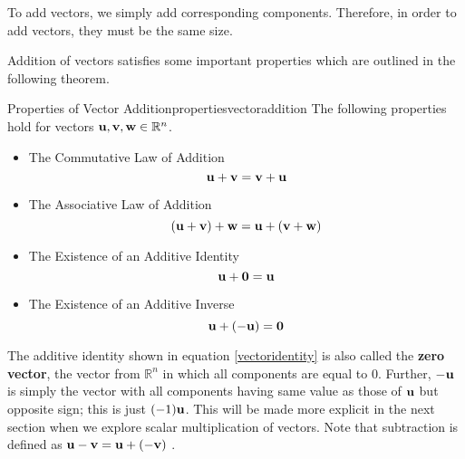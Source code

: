 To add vectors, we simply add corresponding components. Therefore, in order to add vectors, they must
be the same size.

Addition of vectors satisfies some important properties which are outlined in the following theorem.  

\begin{theorem}{Properties of Vector Addition}{propertiesvectoraddition}
The following properties hold for vectors ${\bf u},{\bf v}, {\bf w} \in \mathbb{R}^{n}$.
\begin{itemize}
\item The Commutative Law of Addition
\begin{equation*}
{\bf u}+{\bf v}={\bf v}+{\bf u}
\end{equation*}
\item The Associative Law of Addition
\begin{equation*}
\left( {\bf u}+{\bf v}\right) +{\bf w}={\bf u}+\left( {\bf v}+{\bf w}\right)
\end{equation*}
\item The Existence of an Additive Identity
\begin{equation}
{\bf u}+{\bf 0}={\bf u}
\label{vectoridentity} 
\end{equation}
\item The Existence of an Additive Inverse
\begin{equation*}
{\bf u}+\left( -{\bf u}\right) ={\bf 0}  
\end{equation*}
\end{itemize}
\end{theorem}

The additive identity shown in equation
\ref{vectoridentity} is also called the \textbf{zero vector}, 
the vector from $\mathbb{R}^{n}$ in which all components are equal to $0$.
Further, $-{\bf u}$ is simply the vector with all components having
same value as those of ${\bf u}$ but opposite sign; this is just
$(-1){\bf u}$. This will be made more explicit in the next
section when we explore scalar multiplication of vectors. Note that subtraction is defined as ${\bf u}-{\bf v} = {\bf u}+\left(
-{\bf v} \right)$ .
